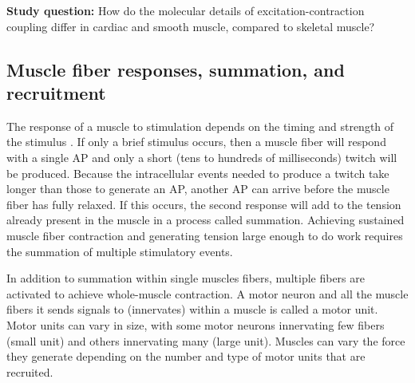 \documentclass[12pt]{article}
\begin{document}
\textbf{Study question:} How do the molecular details of excitation-contraction coupling differ in cardiac and smooth muscle, compared to skeletal muscle?

\subsection*{Muscle fiber responses, summation, and recruitment}

The response of a muscle to stimulation depends on the timing and strength of the stimulus \cite{openStax2016nervous}. If only a brief stimulus occurs, then a muscle fiber will respond with a single AP and only a short (tens to hundreds of milliseconds) twitch will be produced. Because the intracellular events needed to produce a twitch take longer than those to generate an AP, another AP can arrive before the muscle fiber has fully relaxed. If this occurs, the second response will add to the tension already present in the muscle in a process called summation. Achieving sustained muscle fiber contraction and generating tension large enough to do work requires the summation of multiple stimulatory events. 

In addition to summation within single muscles fibers, multiple fibers are activated to achieve whole-muscle contraction. A motor neuron and all the muscle fibers it sends signals to (innervates) within a muscle is called a motor unit. Motor units can vary in size, with some motor neurons innervating few fibers (small unit) and others innervating many (large unit). 
Muscles can vary the force they generate depending on the number and type of motor units that are recruited.

\vspace{0.2cm}
\end{document}
